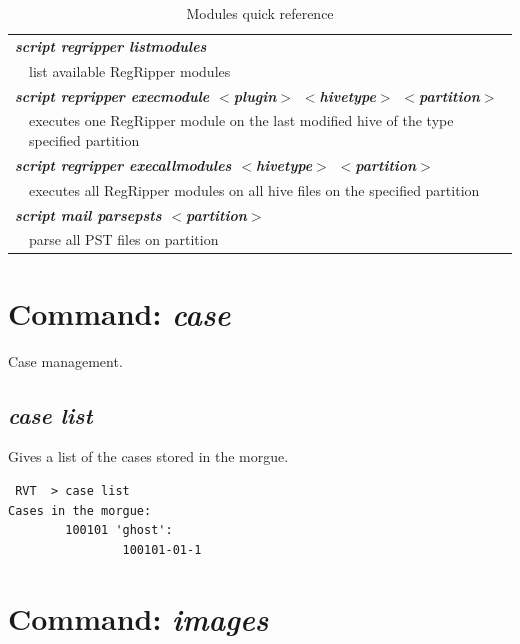 \documentclass[a4paper,11pt,oneside]{report}
\begin{document}
\begin{table}[p]
\begin{tabular}{| p{1cm}  p{10cm} | }
\hline \hline

\multicolumn{2}{|l|}{\it \bf
script regripper listmodules
} \\
 & list available RegRipper modules \\

\multicolumn{2}{|l|}{\it \bf
script repripper execmodule $<$plugin$>$ $<$hivetype$>$ $<$partition$>$
} \\
 & executes one RegRipper module on the last modified hive of the type specified partition \\

\multicolumn{2}{|l|}{\it \bf
script regripper execallmodules $<$hivetype$>$ $<$partition$>$
} \\
 & executes all RegRipper modules on all hive files on the specified partition \\

\hline \hline

\multicolumn{2}{|l|}{\it \bf
script mail parsepsts $<$partition$>$
} \\
 & parse all PST files on partition \\

\hline 



\end{tabular}

\caption{Modules quick reference}\label{tbl:scr-ref}


\end{table}






\section{Command: \emph{case}}

Case management.

\subsection{\emph{case list}}

Gives a list of the cases stored in the morgue.

\begin{verbatim}
 RVT  > case list
Cases in the morgue: 
        100101 'ghost':
                100101-01-1

 \end{verbatim}



\section{Command: \emph{images}}
\end{document}

